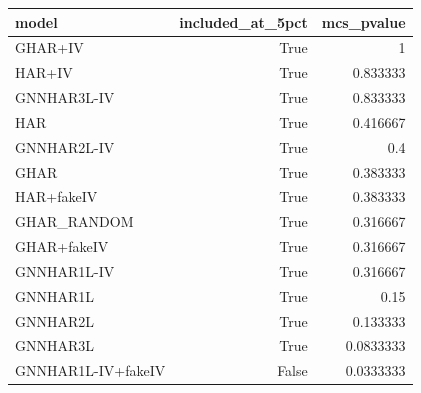 \begin{tabular}{lrr}
\toprule
model & included_at_5pct & mcs_pvalue \\
\midrule
GHAR+IV & True & 1 \\
HAR+IV & True & 0.833333 \\
GNNHAR3L-IV & True & 0.833333 \\
HAR & True & 0.416667 \\
GNNHAR2L-IV & True & 0.4 \\
GHAR & True & 0.383333 \\
HAR+fakeIV & True & 0.383333 \\
GHAR_RANDOM & True & 0.316667 \\
GHAR+fakeIV & True & 0.316667 \\
GNNHAR1L-IV & True & 0.316667 \\
GNNHAR1L & True & 0.15 \\
GNNHAR2L & True & 0.133333 \\
GNNHAR3L & True & 0.0833333 \\
GNNHAR1L-IV+fakeIV & False & 0.0333333 \\
\bottomrule
\end{tabular}
